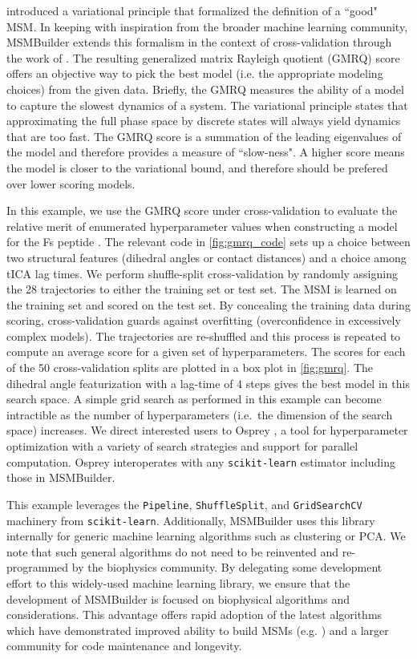 \citet{2014-noe-variational} introduced a variational principle that
formalized the definition of a ``good" MSM. In keeping with inspiration
from the broader machine learning community, MSMBuilder extends this
formalism in the context of cross-validation through the work of
\citet{2015-gmrq}. The resulting generalized matrix Rayleigh
quotient (GMRQ) score offers an objective way to pick the best model (i.e. the
appropriate modeling choices) from the given data. Briefly, the GMRQ measures
the ability of a model to capture the slowest dynamics of a system. The
variational principle states that approximating the full phase space
by discrete states  will always yield dynamics that are too fast.
The GMRQ score is a summation of the leading eigenvalues of the model
and therefore provides a measure of ``slow-ness".
A higher score means the model is closer to the variational bound, and
therefore should be prefered over lower scoring models.

In this example, we use the GMRQ score under cross-validation to evaluate
the relative merit of enumerated hyperparameter values when constructing a
model for the Fs peptide \cite{2014-fs-peptide}. The relevant code in
\cref{fig:gmrq_code} sets up a choice between two structural features
(dihedral angles or contact distances) and a choice among tICA lag times.
We perform shuffle-split cross-validation by randomly assigning the 28
trajectories to either the training set or test set. The MSM is learned on
the training set and scored on the test set. By concealing the training
data during scoring, cross-validation guards against overfitting
(overconfidence in excessively complex models). The trajectories are
re-shuffled and this process is repeated to compute an average score for a
given set of hyperparameters.  The scores for each of the 50
cross-validation splits are plotted in a box plot in \cref{fig:gmrq}.
The dihedral angle featurization with a lag-time of 4 steps gives the best model in this
search space.  A simple grid search as performed in this example can become
intractible as the number of hyperparameters (i.e.~the dimension of the
search space) increases. We direct interested users to Osprey
\cite{2016-osprey}, a tool for hyperparameter optimization with a variety
of search strategies and support for parallel computation.
Osprey interoperates with any \texttt{scikit-learn} estimator
including those in MSMBuilder.

This example leverages the \texttt{Pipeline}, \texttt{ShuffleSplit}, and
\texttt{GridSearchCV} machinery from \texttt{scikit-learn}. Additionally,
MSMBuilder uses this library internally for generic machine learning
algorithms such as clustering or PCA. We note that such general algorithms
do not need to be reinvented and re-programmed by the biophysics community.
By delegating some development effort to this widely-used machine learning
library, we ensure that the development of MSMBuilder is focused on
biophysical algorithms and considerations.
This advantage offers rapid adoption of the latest algorithms which have
demonstrated improved ability to build MSMs (e.g. \cite{2015-gmrq}) and a
larger community for code maintenance and longevity.


